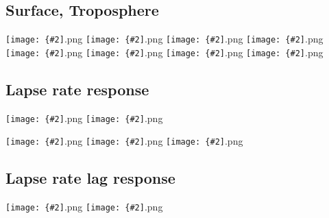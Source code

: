 \documentclass[12pt,a4paper]{article}
\newcommand{\pngfig}[2][0.5]{\texttt{[image: \{\#2]}.png}}
\begin{document}
\section{}

\subsection{Surface, Troposphere}
\pngfig[0.5]{comp_Tmax_sfc}
\pngfig[0.5]{comp_Tmin_sfc}
\pngfig[0.5]{comp_Tmax_850}
\pngfig[0.5]{comp_Tmin_850}
\pngfig[0.5]{comp_Tmax_700}
\pngfig[0.5]{comp_Tmin_700}
\pngfig[0.5]{comp_Tmax_300}
\pngfig[0.5]{comp_Tmin_300}

\subsection{Lapse rate response}
\pngfig[0.5]{regprof_TO_Zon_NH}
\pngfig[0.5]{comp_trop_zonal_profiles_m06}

\pngfig[0.5]{zonal_prof_land}
\pngfig[0.5]{zonal_prof_ocean}
\pngfig[0.5]{zonal_prof}

\subsection{Lapse rate lag response}

\pngfig[0.5]{3d_lag_lat15_30_v1}
\pngfig[0.5]{3d_lag_lat15_30_v2}
\end{document}
